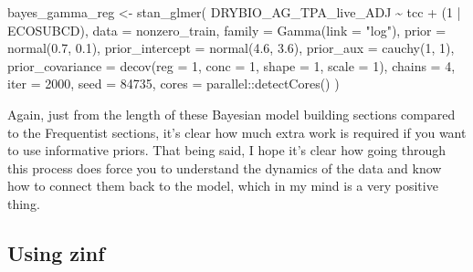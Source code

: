 \documentclass[12pt,twoside]{reedthesis}
\newenvironment{Shaded}{\begin{snugshade}}{\end{snugshade}}
\newcommand{\AttributeTok}[1]{\textcolor[rgb]{0.77,0.63,0.00}{#1}}
\newcommand{\DecValTok}[1]{\textcolor[rgb]{0.00,0.00,0.81}{#1}}
\newcommand{\FloatTok}[1]{\textcolor[rgb]{0.00,0.00,0.81}{#1}}
\newcommand{\FunctionTok}[1]{\textcolor[rgb]{0.00,0.00,0.00}{#1}}
\newcommand{\NormalTok}[1]{#1}
\newcommand{\OtherTok}[1]{\textcolor[rgb]{0.56,0.35,0.01}{#1}}
\newcommand{\SpecialCharTok}[1]{\textcolor[rgb]{0.00,0.00,0.00}{#1}}
\newcommand{\StringTok}[1]{\textcolor[rgb]{0.31,0.60,0.02}{#1}}
\begin{document}
\begin{Shaded}
\begin{Highlighting}[]
\NormalTok{bayes\_gamma\_reg }\OtherTok{\textless{}{-}} \FunctionTok{stan\_glmer}\NormalTok{(}
\NormalTok{  DRYBIO\_AG\_TPA\_live\_ADJ }\SpecialCharTok{\textasciitilde{}}\NormalTok{ tcc }\SpecialCharTok{+}\NormalTok{ (}\DecValTok{1} \SpecialCharTok{|}\NormalTok{ ECOSUBCD),}
  \AttributeTok{data =}\NormalTok{ nonzero\_train,}
  \AttributeTok{family =} \FunctionTok{Gamma}\NormalTok{(}\AttributeTok{link =} \StringTok{"log"}\NormalTok{),}
  \AttributeTok{prior =} \FunctionTok{normal}\NormalTok{(}\FloatTok{0.7}\NormalTok{, }\FloatTok{0.1}\NormalTok{),}
  \AttributeTok{prior\_intercept =} \FunctionTok{normal}\NormalTok{(}\FloatTok{4.6}\NormalTok{, }\FloatTok{3.6}\NormalTok{),}
  \AttributeTok{prior\_aux =} \FunctionTok{cauchy}\NormalTok{(}\DecValTok{1}\NormalTok{, }\DecValTok{1}\NormalTok{),}
  \AttributeTok{prior\_covariance =} \FunctionTok{decov}\NormalTok{(}\AttributeTok{reg =} \DecValTok{1}\NormalTok{, }\AttributeTok{conc =} \DecValTok{1}\NormalTok{, }\AttributeTok{shape =} \DecValTok{1}\NormalTok{, }\AttributeTok{scale =} \DecValTok{1}\NormalTok{),}
  \AttributeTok{chains =} \DecValTok{4}\NormalTok{, }\AttributeTok{iter =} \DecValTok{2000}\NormalTok{, }\AttributeTok{seed =} \DecValTok{84735}\NormalTok{,}
  \AttributeTok{cores =}\NormalTok{ parallel}\SpecialCharTok{::}\FunctionTok{detectCores}\NormalTok{()}
\NormalTok{)}
\end{Highlighting}
\end{Shaded}
Again, just from the length of these Bayesian model building sections compared to the Frequentist sections, it's clear how much extra work is required if you want to use informative priors. That being said, I hope it's clear how going through this process does force you to understand the dynamics of the data and know how to connect them back to the model, which in my mind is a very positive thing.

\hypertarget{using-zinf}{%
\subsection{Using zinf}\label{using-zinf}}
\end{document}
